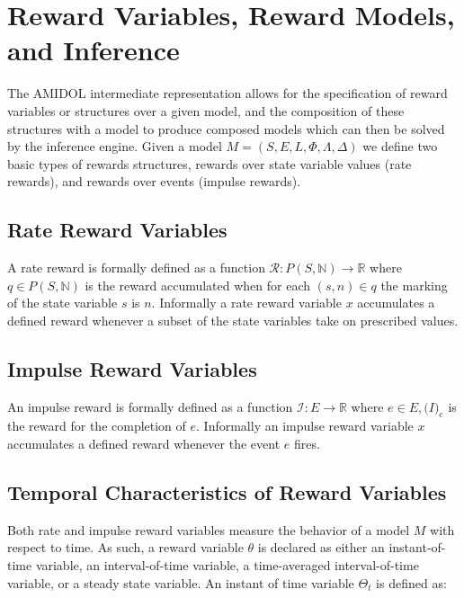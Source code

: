 \documentclass[11pt]{article}
\newcommand{\amidol}{\textsc{AMIDOL}}
\begin{document}
\section{Reward Variables, Reward Models, and Inference}

The \amidol{} intermediate representation allows for the specification of reward variables or structures over a given model, and the composition of these structures with a model to produce composed models which can then be solved by the inference engine.  Given a model $M = (S, E, L, \Phi, \Lambda, \Delta)$ we define two basic types of rewards structures, rewards over state variable values (rate rewards), and rewards over events (impulse rewards).

\cite{qureshi1996algorithms,deavours1999efficient,ciardo1996well,sanders1991reduced}

\subsection{Rate Reward Variables}

A rate reward is formally defined as a function $\mathcal{R}: P(S, \mathbb{N}) \rightarrow \mathbb{R}$ where $q \in P(S, \mathbb{N})$ is the reward accumulated when for each $(s,n) \in q$ the marking of the state variable $s$ is $n$.  Informally a rate reward variable $x$ accumulates a defined reward whenever a subset of the state variables take on prescribed values.

\subsection{Impulse Reward Variables}

An impulse reward is formally defined as a function $\mathcal{I}: E \rightarrow \mathbb{R}$ where $e \in E, \mathcal(I)_e$ is the reward for the completion of $e$.  Informally an impulse reward variable $x$ accumulates a defined reward whenever the event $e$ fires.

\subsection{Temporal Characteristics of Reward Variables}

Both rate and impulse reward variables measure the behavior of a model $M$ with respect to time.  As such, a reward variable $\theta$ is declared as either an instant-of-time variable, an interval-of-time variable, a time-averaged interval-of-time variable, or a steady state variable.  An instant of time variable $\Theta_t$ is defined as:
\end{document}
